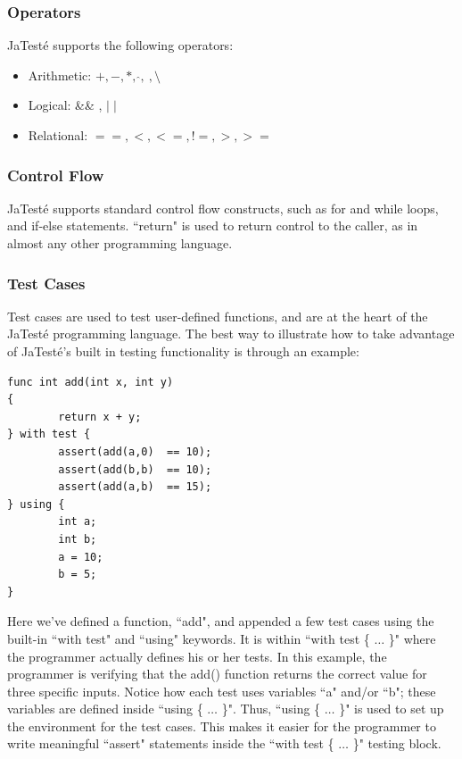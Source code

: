 \documentclass{article}
\begin{document}
\subsubsection{Operators}
JaTest\'{e} supports the following operators:
\begin{itemize}
\item Arithmetic: $+, -, *, \ \hat{}, \  ,\setminus $
\item Logical: \&\& , $\mid \mid$
\item Relational: $== , <, <=, !=, >, >=$
\end{itemize}
\subsubsection{Control Flow}
JaTest\'{e} supports standard control flow constructs, such as for and while loops, and if-else statements. ``return" is used to return control to the caller, as in almost any other programming language. 
\subsubsection{Test Cases}
Test cases are used to test user-defined functions, and are at the heart of the JaTest\'{e} programming language. The best way to illustrate how to take advantage of JaTest\'{e}'s built in testing functionality is through an example:
\begin{lstlisting}
func int add(int x, int y)
{
        return x + y;
} with test {
        assert(add(a,0)  == 10);
        assert(add(b,b)  == 10);
        assert(add(a,b)  == 15);
} using {
        int a;
        int b;
        a = 10;
        b = 5;
}
\end{lstlisting}
Here we've defined a function, ``add", and appended a few test cases using the built-in ``with test" and ``using" keywords.
It is within ``with test \{ $\ldots$ \}" where the programmer actually defines his or her tests. In this example, the programmer is verifying that the add() function returns the correct value for three specific inputs. Notice how each test uses variables ``a" and/or ``b"; these variables are defined inside ``using \{ $\ldots$ \}".  Thus,  ``using \{ $\ldots$ \}" is used to set up the environment for the test cases. This makes it easier for the programmer to write meaningful ``assert" statements inside the ``with test \{ $\ldots$ \}" testing block.
\end{document}
